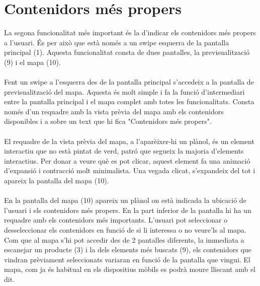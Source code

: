\documentclass{article}
\begin{document}
\section{Contenidors més propers}
La segona funcionalitat més important és la d'indicar els contenidors més
propers a l'usuari. És per això que està només a un swipe esquerra de la
pantalla principal (1). Aquesta funcionalitat consta de dues pantalles,
la previsualització (9) i el mapa (10).\\
\\
Fent un swipe a l'esquerra des de la pantalla principal s'accedeix a la
pantalla de previsualització del mapa. Aquesta és molt simple i fa la
funció d'intermediari entre la pantalla principal i el mapa complet amb
totes les funcionalitats. Consta només d'un requadre amb la vista prèvia
del mapa amb els contenidors disponibles i a sobre un text que hi fica
"Contenidors més propers".\\
\\
El requadre de la vista prèvia del mapa, a l'aparèixer-hi un plànol, és un
element interactiu que no està pintat de verd, patró que segueix la
majoria d'elements interactius. Per donar a veure què es pot clicar,
aquest element fa una animació d'expansió i contracció molt minimalista.
Una vegada clicat, s'expandeix del tot i apareix la pantalla del mapa (10).
\\\\
%
En la pantalla del mapa (10) apareix un plànol on està indicada la ubicació
de l'usuari i els contenidors més propers. En la part inferior de la pantalla
hi ha un requadre amb els contenidors més importants. L'usuari pot seleccionar
o desseleccionar els contenidors en funció de si li interessa o no veure'ls al
mapa. Com que al mapa s'hi pot accedir des de 2 pantalles diferents, la immediata
a escanejar un producte (3) i la dels elements més buscats (9), els contenidors
que vindran prèviament seleccionats variaran en funció de la pantalla que vingui.
El mapa, com ja és habitual en els dispositius mòbils es podrà moure lliscant
amb el dit.
\end{document}
